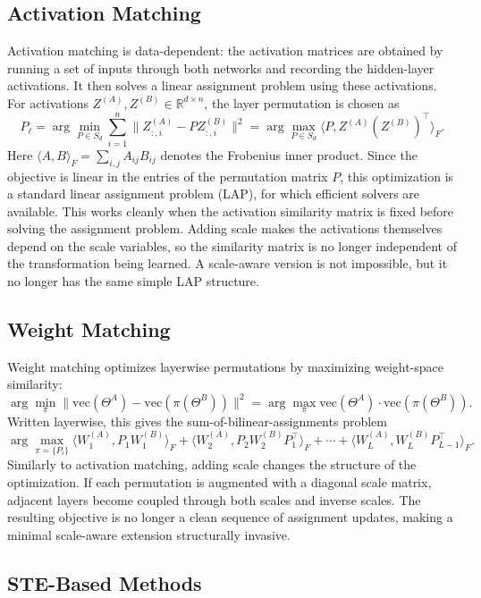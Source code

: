 \documentclass[11pt,a4paper]{report}
\begin{document}
\subsection{Activation Matching}
Activation matching is data-dependent: the activation matrices are obtained by running a set of inputs through both networks and recording the hidden-layer activations. It then solves a linear assignment problem using these activations. For activations \(Z^{(A)}, Z^{(B)} \in \mathbb{R}^{d \times n}\), the layer permutation is chosen as
\[
P_\ell
=
\arg\min_{P \in S_d}
\sum_{i=1}^n \|Z^{(A)}_{:,i} - P Z^{(B)}_{:,i}\|^2
=
\arg\max_{P \in S_d}
\langle P, Z^{(A)}(Z^{(B)})^\top \rangle_F.
\]
Here \(\langle A,B\rangle_F=\sum_{i,j}A_{ij}B_{ij}\) denotes the Frobenius inner product. Since the objective is linear in the entries of the permutation matrix \(P\), this optimization is a standard linear assignment problem (LAP), for which efficient solvers are available.
This works cleanly when the activation similarity matrix is fixed before solving the assignment problem. Adding scale makes the activations themselves depend on the scale variables, so the similarity matrix is no longer independent of the transformation being learned. A scale-aware version is not impossible, but it no longer has the same simple LAP structure.


\subsection{Weight Matching}

Weight matching optimizes layerwise permutations by maximizing weight-space similarity:
\[
\arg\min_{\pi} \|\mathrm{vec}(\Theta^A)-\mathrm{vec}(\pi(\Theta^B))\|^2
=
\arg\max_{\pi}\mathrm{vec}(\Theta^A)\cdot\mathrm{vec}(\pi(\Theta^B)).
\]
Written layerwise, this gives the sum-of-bilinear-assignments problem
\[
\arg\max_{\pi=\{P_i\}}
\langle W_1^{(A)},P_1W_1^{(B)}\rangle_F
+\langle W_2^{(A)},P_2W_2^{(B)}P_1^\top\rangle_F
+\cdots+
\langle W_L^{(A)},W_L^{(B)}P_{L-1}^\top\rangle_F.
\]
Similarly to activation matching, adding scale changes the structure of the optimization. If each permutation is augmented with a diagonal scale matrix, adjacent layers become coupled through both scales and inverse scales. The resulting objective is no longer a clean sequence of assignment updates, making a minimal scale-aware extension structurally invasive.


\subsection{STE-Based Methods}
\end{document}
